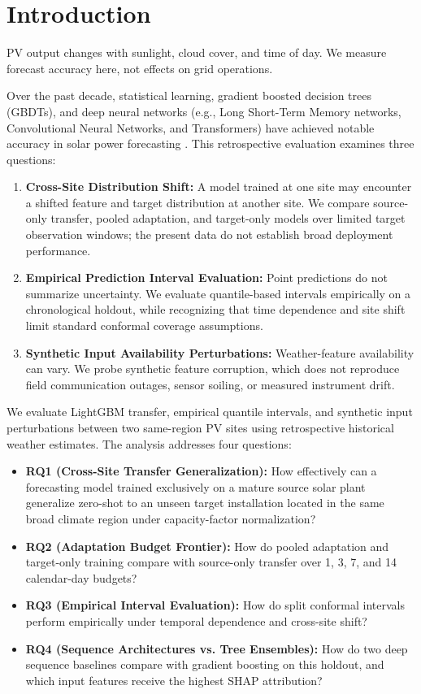 \documentclass[preprint,12pt,authoryear]{elsarticle}
\begin{document}
\section{Introduction}
\label{sec:introduction}
PV output changes with sunlight, cloud cover, and time of day. We measure forecast accuracy here, not effects on grid operations.

Over the past decade, statistical learning, gradient boosted decision trees (GBDTs), and deep neural networks (e.g., Long Short-Term Memory networks, Convolutional Neural Networks, and Transformers) have achieved notable accuracy in solar power forecasting \citep{yang2018history}. This retrospective evaluation examines three questions:
\begin{enumerate}
    \item \textbf{Cross-Site Distribution Shift:} A model trained at one site may encounter a shifted feature and target distribution at another site. We compare source-only transfer, pooled adaptation, and target-only models over limited target observation windows; the present data do not establish broad deployment performance.
    \item \textbf{Empirical Prediction Interval Evaluation:} Point predictions do not summarize uncertainty. We evaluate quantile-based intervals empirically on a chronological holdout, while recognizing that time dependence and site shift limit standard conformal coverage assumptions.
    \item \textbf{Synthetic Input Availability Perturbations:} Weather-feature availability can vary. We probe synthetic feature corruption, which does not reproduce field communication outages, sensor soiling, or measured instrument drift.
\end{enumerate}

We evaluate LightGBM transfer, empirical quantile intervals, and synthetic input perturbations between two same-region PV sites using retrospective historical weather estimates. The analysis addresses four questions:
\begin{itemize}
    \item \textbf{RQ1 (Cross-Site Transfer Generalization):} How effectively can a forecasting model trained exclusively on a mature source solar plant generalize zero-shot to an unseen target installation located in the same broad climate region under capacity-factor normalization?
    \item \textbf{RQ2 (Adaptation Budget Frontier):} How do pooled adaptation and target-only training compare with source-only transfer over 1, 3, 7, and 14 calendar-day budgets?
    \item \textbf{RQ3 (Empirical Interval Evaluation):} How do split conformal intervals perform empirically under temporal dependence and cross-site shift?
    \item \textbf{RQ4 (Sequence Architectures vs. Tree Ensembles):} How do two deep sequence baselines compare with gradient boosting on this holdout, and which input features receive the highest SHAP attribution?
\end{itemize}
\end{document}
